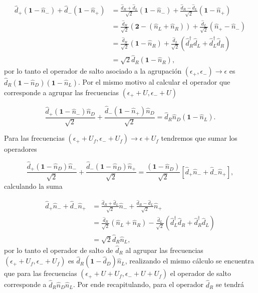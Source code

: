 \begin{appendixs}
\begin{align*}
    \hat{d}_{+}(\textbf{1}-\hat{n}_{-}) + \hat{d}_{-}(\textbf{1}-\hat{n}_{+}) & =  \frac{\hat{d}_{R} + \hat{d}_{L}}{\sqrt{2}}(\textbf{1} - \hat{n}_{-}) + \frac{\hat{d}_{R} - \hat{d}_{L}}{\sqrt{2}}(\textbf{1} - \hat{n}_{+})   \\
    & = \frac{\hat{d}_{R}}{\sqrt{2}}(\textbf{2} - (\hat{n}_{L} + \hat{n}_{R})) + \frac{\hat{d}_{L}}{\sqrt{2}} (\hat{n}_{+}-\hat{n}_{-}) \\
    & = \frac{\hat{d}_{R}}{\sqrt{2}}(\textbf{1} -  \hat{n}_{R}) + \frac{\hat{d}_{L}}{\sqrt{2}} (\hat{d}^{\dagger}_{R}\hat{d}_{L} + \hat{d}^{\dagger}_{L}\hat{d}_{R}) \\
    & = \sqrt{2}\hat{d}_{R}(\textbf{1}-\hat{n}_{R}),
\end{align*}
por lo tanto el operador de salto asociado a la agrupación $(\epsilon_{+},\epsilon_{-})\to \epsilon$ es $\hat{d}_{R}(\textbf{1}-\hat{n}_{D})(\textbf{1}-\hat{n}_{L})$. Por el mismo motivo al calcular el operador que corresponde a agrupar las frecuencias $(\epsilon_{+}+U,\epsilon_{-}+U)$ 

\begin{equation*}
    \frac{\hat{d}_{+}(\textbf{1}-\hat{n}_{-})\hat{n}_{D}}{\sqrt{2}} + \frac{\hat{d}_{-}(\textbf{1}-\hat{n}_{+})\hat{n}_{D}}{\sqrt{2}}  = \hat{d}_{R}\hat{n}_{D}(\textbf{1}-\hat{n}_{L}).
\end{equation*}

Para las frecuencias $(\epsilon_{+}+U_{f},\epsilon_{-}+U_{f})\to \epsilon + U_{f}$ tendremos que sumar los operadores

\begin{equation*}
    \frac{\hat{d}_{+}(\textbf{1}-\hat{n}_{D})\hat{n}_{-} }{\sqrt{2}} + \frac{\hat{d}_{-}(\textbf{1}-\hat{n}_{D})\hat{n}_{+} }{\sqrt{2}} = \frac{(\textbf{1}-\hat{n}_{D})}{\sqrt{2}} [\hat{d}_{+}\hat{n}_{-} + \hat{d}_{-}\hat{n}_{+}],
\end{equation*}
calculando la suma

\begin{align*}
    \hat{d}_{+}\hat{n}_{-} + \hat{d}_{-}\hat{n}_{+} & = \frac{\hat{d}_{R}+\hat{d}_{L}}{\sqrt{2}}\hat{n}_{-} + \frac{\hat{d}_{R}-\hat{d}_{L}}{\sqrt{2}}\hat{n}_{+}  \\
    & = \frac{\hat{d}_{R}}{\sqrt{2}}(\hat{n}_{L}+\hat{n}_{R}) - \frac{\hat{d}_{L}}{\sqrt{2}}(\hat{d}^{\dagger}_{L}\hat{d}_{R}+\hat{d}^{\dagger}_{R}\hat{d}_{L}) \\
    & = \sqrt{2}\hat{d}_{R}\hat{n}_{L},
\end{align*}
por lo tanto el operador de salto de $\hat{d}_{R}$ al agrupar las frecuencias $(\epsilon_{+}+U_{f},\epsilon_{-}+U_{f})$ es $\hat{d}_{R}(\textbf{1}-\hat{d}_{D})\hat{n}_{L}$, realizando el mismo cálculo se encuentra que para las frecuencias $(\epsilon_{+}+U+U_{f},\epsilon_{-}+U+U_{f})$ el operador de salto corresponde a $\hat{d}_{R}\hat{n}_{D}\hat{n}_{L}$. Por ende recapitulando, para el operador $\hat{d}_{R}$ se tendrá


\end{appendixs}
